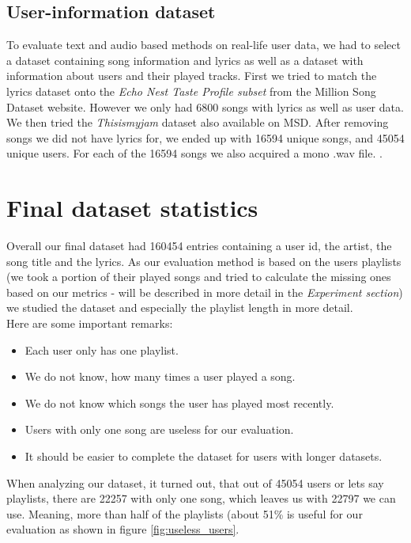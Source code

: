\subsection{User-information dataset}
To evaluate text and audio based methods on real-life user data, we had to select a dataset containing song information and lyrics as well as a dataset with information about users and their played tracks. First we tried to match the lyrics dataset onto the \textit{Echo Nest Taste Profile subset}  from the Million Song Dataset website. However we only had 6800 songs with lyrics as well as user data.  We then tried the \textit{Thisismyjam} dataset also available on MSD. After removing songs we did not have lyrics for, we ended up with 16594 unique songs, and 45054 unique users. For each of the 16594 songs we also acquired a mono .wav file. . \\

\section{Final dataset statistics}
Overall our final dataset had 160454 entries containing a user id, the artist, the song title and the lyrics. As our evaluation method is based on the users playlists (we took a portion of their played songs and tried to calculate the missing ones based on our metrics - will be described in more detail in the \textit{Experiment section}) we studied the dataset and especially the playlist length in more detail.\\
Here are some important remarks:
\begin{itemize}
    \item Each user only has one playlist.
    \item We do not know, how many times a user played a song.
    \item We do not know which songs the user has played most recently.
    \item Users with only one song are useless for our evaluation.
    \item It should be easier to complete the dataset for users with longer datasets.
\end{itemize} 
When analyzing our dataset, it turned out, that out of 45054 users or lets say playlists, there are 22257 with only one song, which leaves us with 22797 we can use. Meaning, more than half of the playlists (about 51\% is useful for our evaluation as shown in figure \ref{fig:useless_users}.

